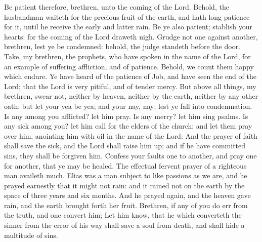  Be patient therefore, brethren, unto the coming of the
Lord. Behold, the husbandman waiteth for the precious fruit of the
earth, and hath long patience for it, until he receive the early and
latter rain.  Be ye also patient; stablish your hearts: for
the coming of the Lord draweth nigh.  Grudge not one against
another, brethren, lest ye be condemned: behold, the judge standeth
before the door.  Take, my brethren, the prophets, who have
spoken in the name of the Lord, for an example of suffering affliction,
and of patience.  Behold, we count them happy which endure.
Ye have heard of the patience of Job, and have seen the end of the Lord;
that the Lord is very pitiful, and of tender mercy.  But
above all things, my brethren, swear not, neither by heaven, neither by
the earth, neither by any other oath: but let your yea be yea; and your
nay, nay; lest ye fall into condemnation.  Is any among you
afflicted? let him pray. Is any merry? let him sing psalms.
 Is any sick among you? let him call for the elders of the
church; and let them pray over him, anointing him with oil in the name
of the Lord:  And the prayer of faith shall save the sick,
and the Lord shall raise him up; and if he have committed sins, they
shall be forgiven him.  Confess your faults one to another,
and pray one for another, that ye may be healed. The effectual fervent
prayer of a righteous man availeth much.  Elias was a man
subject to like passions as we are, and he prayed earnestly that it
might not rain: and it rained not on the earth by the space of three
years and six months.  And he prayed again, and the heaven
gave rain, and the earth brought forth her fruit. 
Brethren, if any of you do err from the truth, and one convert him;
 Let him know, that he which converteth the sinner from the
error of his way shall save a soul from death, and shall hide a
multitude of sins.
